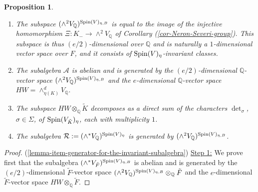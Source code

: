 \documentclass[12pt]{amsart}
\numberwithin{equation}{subsection}
\theoremstyle{plain}
\newtheorem{prop}[thm]{Proposition}
\theoremstyle{definition}
\newcommand{\A}{{\mathcal A}}
\newcommand{\QQ}{{\mathbb Q}}
\newcommand{\R}{{\mathcal R}}
\newcommand{\Spin}{{\rm Spin}}
\begin{document}
{\begin{prop}
\label{prop-generator-for-the-invariant-subalgebra}
\begin{enumerate}
\item
\label{lemma-item-Spin-V-eta-B-invariant-2-forms}
The subspace $(\wedge^2V_\QQ)^{\Spin(V)_{\eta,B}}$ is equal to the image of the injective homomorphism $\Xi:K_-\rightarrow  \wedge^2V_\QQ$ of Corollary (\ref{cor-Neron-Severi-group}). This subspace is thus $(e/2)$-dimensional over $\QQ$ and is naturally a $1$-dimensional  vector space over $F$, and it
consists of $\Spin(V)_\eta$-invariant classes. 
\item
\label{lemma-item-generator-for-the-invariant-subalgebra}
The subalgebra $\A$ is abelian and is generated by the $(e/2)$-dimensional $\QQ$-vector space 
$(\wedge^2V_\QQ)^{\Spin(V)_{\eta,B}}$
and the $e$-dimensional $\QQ$-vector space 
$
HW=\wedge^d_{\eta(K)}V_\QQ.
$
\item
\label{lemma-item-decomposition-of-HW-into-characters}
The subspace  $HW\otimes_\QQ\tilde{K}$ decomposes as a direct sum of the characters $\det_\sigma$, $\sigma\in\Sigma$, of $\Spin(V_{\tilde{K}})_\eta$, each with multiplicity $1$.
\item
\label{lemma-item-generatyors-for-the-invariant-subalgebra-R}
The subalgebra $\R:=(\wedge^*V_\QQ)^{\Spin(V)_\eta}$ is generated by $(\wedge^2V_\QQ)^{\Spin(V)_{\eta,B}}$.
\end{enumerate}
\end{prop}


\begin{proof}
(\ref{lemma-item-generator-for-the-invariant-subalgebra}) \underline{Step 1:}
We prove first that the subalgebra $(\wedge^*V_{\tilde{F}})^{\Spin(V)_{\eta,B}}$ is abelian and is generated by the $(e/2)$-dimensional $\tilde{F}$-vector space 
$(\wedge^2V_\QQ)^{\Spin(V)_{\eta,B}}\otimes_\QQ{\tilde{F}}$
and the $e$-dimensional $\tilde{F}$-vector space 
$
HW\otimes_\QQ{\tilde{F}}.
$



\end{proof}}
\end{document}

